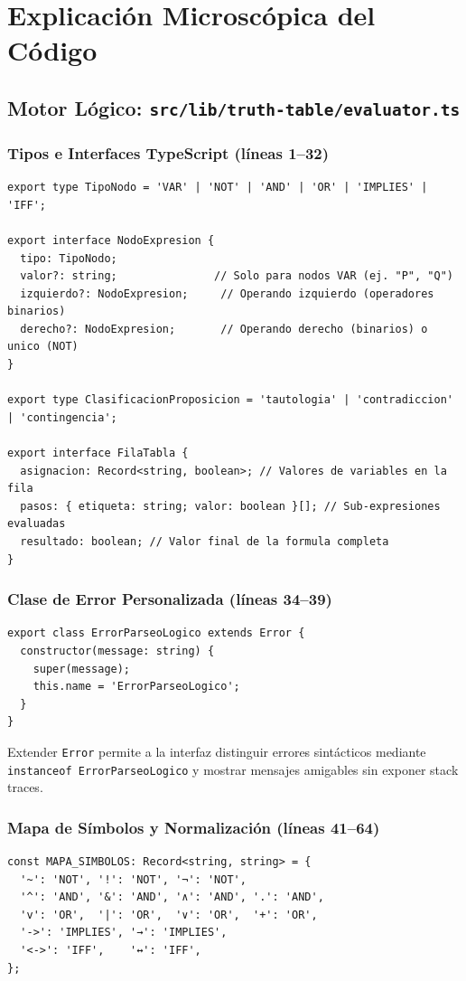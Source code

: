 \documentclass[11pt,a4paper]{article}
\begin{document}
\section{Explicación Microscópica del Código}

\subsection{Motor Lógico: \texttt{src/lib/truth-table/evaluator.ts}}

\subsubsection{Tipos e Interfaces TypeScript (líneas 1--32)}
\begin{lstlisting}[caption={Definición de tipos base del motor (evaluator.ts).}]
export type TipoNodo = 'VAR' | 'NOT' | 'AND' | 'OR' | 'IMPLIES' | 'IFF';

export interface NodoExpresion {
  tipo: TipoNodo;
  valor?: string;               // Solo para nodos VAR (ej. "P", "Q")
  izquierdo?: NodoExpresion;     // Operando izquierdo (operadores binarios)
  derecho?: NodoExpresion;       // Operando derecho (binarios) o unico (NOT)
}

export type ClasificacionProposicion = 'tautologia' | 'contradiccion' | 'contingencia';

export interface FilaTabla {
  asignacion: Record<string, boolean>; // Valores de variables en la fila
  pasos: { etiqueta: string; valor: boolean }[]; // Sub-expresiones evaluadas
  resultado: boolean; // Valor final de la formula completa
}
\end{lstlisting}

\subsubsection{Clase de Error Personalizada (líneas 34--39)}
\begin{lstlisting}[caption={Clase de error específica del motor.}]
export class ErrorParseoLogico extends Error {
  constructor(message: string) {
    super(message);
    this.name = 'ErrorParseoLogico';
  }
}
\end{lstlisting}
Extender \texttt{Error} permite a la interfaz distinguir errores sintácticos mediante \texttt{instanceof ErrorParseoLogico} y mostrar mensajes amigables sin exponer stack traces.

\subsubsection{Mapa de Símbolos y Normalización (líneas 41--64)}
\begin{lstlisting}[caption={Mapa de símbolos y función normalizadora.}]
const MAPA_SIMBOLOS: Record<string, string> = {
  '~': 'NOT', '!': 'NOT', '¬': 'NOT',
  '^': 'AND', '&': 'AND', '∧': 'AND', '.': 'AND',
  'v': 'OR',  '|': 'OR',  '∨': 'OR',  '+': 'OR',
  '->': 'IMPLIES', '→': 'IMPLIES',
  '<->': 'IFF',    '↔': 'IFF',
};
\end{lstlisting}
\end{document}
